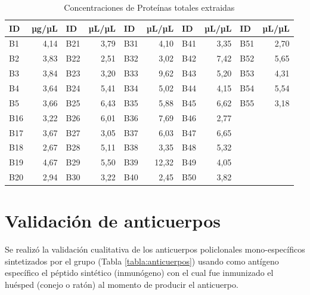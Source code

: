 \documentclass[12pt,letterpaper,oneside]{scrbook}
\begin{document}
\begin{table}[h]
\begin{center}
    \begin{threeparttable}
      \caption{Concentraciones de Proteínas totales extraidas}\label{tablaPROTEINAS}
      \begin{tabular}{l r l r l r l r l r}
    \toprule
    \textbf{ID} & \textbf{µg/µL} & \textbf{ID} & \textbf{µL/µL} & \textbf{ID} & \textbf{µL/µL} & \textbf{ID} & \textbf{µL/µL} & \textbf{ID} & \textbf{µL/µL}\\
    \midrule
    B1 & 4,14 & B21 & 3,79 & B31 & 4,10 & B41 & 3,35 & B51 & 2,70 \\
    B2 & 3,83 & B22 & 2,51 & B32 & 3,02 & B42 & 7,42 & B52 & 5,65 \\
    B3 & 3,84 & B23 & 3,20 & B33 & 9,62 & B43 & 5,20 & B53 & 4,31 \\
    B4 & 3,64 & B24 & 5,41 & B34 & 5,02 & B44 & 4,15 & B54 & 5,54 \\
    B5 & 3,66 & B25 & 6,43 & B35 & 5,88 & B45 & 6,62 & B55 & 3,18 \\
    B16 & 3,22 & B26 & 6,01 & B36 & 7,69 & B46 & 2,77 & \\
    B17 & 3,67 & B27 & 3,05 & B37 & 6,03 & B47 & 6,65 & \\
    B18 & 2,67 & B28 & 5,11 & B38 & 3,35 & B48 & 5,32 & \\
    B19 & 4,67 & B29 & 5,50 & B39 & 12,32 & B49 & 4,05 & \\
    B20 & 2,94 & B30 & 3,22 & B40 & 2,45 & B50 & 3,82 & \\
\bottomrule
\end{tabular}
\end{threeparttable}
\end{center}
\end{table}

\section{Validación de anticuerpos}

Se realizó la validación cualitativa de los anticuerpos policlonales
mono-específicos sintetizados por el grupo (Tabla
\ref{tabla:anticuerpos}) usando como antígeno específico el péptido
sintético (inmunógeno) con el cual fue inmunizado el huésped (conejo o
ratón) al momento de producir el anticuerpo.
\end{document}
